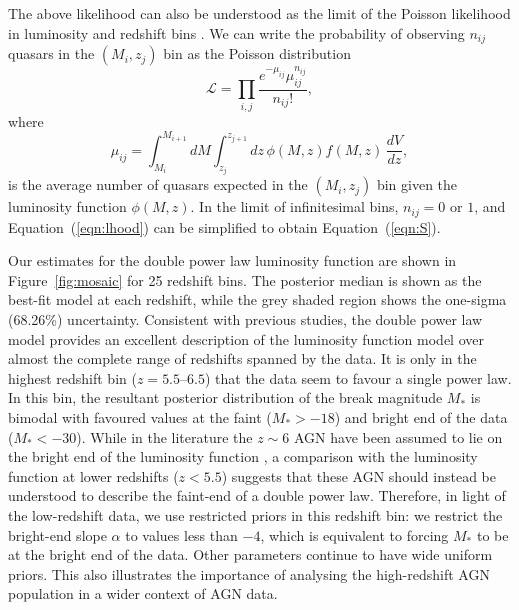 \documentclass[a4paper,fleqn,usenatbib]{mnras}
\begin{document}
The above likelihood can also be understood as the limit of the
Poisson likelihood in luminosity and redshift bins
\citep{1983ApJ...269...35M, 2001AJ....121...54F}.  We can write the
probability of observing $n_{ij}$ quasars in the $(M_i, z_j)$ bin as
the Poisson distribution
\begin{equation}
  \mathcal{L}=\prod_{i,j}\frac{e^{-\mu_{ij}}\mu_{ij}^{n_{ij}}}{n_{ij}!},
  \label{eqn:lhood}
\end{equation}
where 
\begin{equation}
  \mu_{ij}= \int_{M_i}^{M_{i+1}}dM\int_{z_j}^{z_{j+1}}dz\, \phi(M,z) f(M, z)
  \,\frac{dV}{dz},
\end{equation}
is the average number of quasars expected in the $(M_i, z_j)$ bin
given the luminosity function $\phi(M,z)$.  In the limit of
infinitesimal bins, $n_{ij}=0$ or $1$, and Equation~(\ref{eqn:lhood})
can be simplified to obtain Equation~(\ref{eqn:S}).

Our estimates for the double power law luminosity function are shown
in Figure~\ref{fig:mosaic} for 25 redshift bins.  The posterior median
is shown as the best-fit model at each redshift, while the grey shaded
region shows the one-sigma (68.26\%) uncertainty.  Consistent with
previous studies, the double power law model provides an excellent
description of the luminosity function model over almost the complete
range of redshifts spanned by the data.  It is only in the highest
redshift bin ($z=5.5$--$6.5$) that the data seem to favour a single
power law.  In this bin, the resultant posterior distribution of the
break magnitude $M_*$ is bimodal with favoured values at the faint
($M_*>-18$) and bright end of the data ($M_*<-30$).  While in the
literature the $z\sim 6$ AGN have been assumed to lie on the bright
end of the luminosity function \citep[e.g.,][]{2016ApJ...833..222J}, a
comparison with the luminosity function at lower redshifts ($z<5.5$)
suggests that these AGN should instead be understood to describe the
faint-end of a double power law.  Therefore, in light of the
low-redshift data, we use restricted priors in this redshift bin: we
restrict the bright-end slope $\alpha$ to values less than $-4$, which
is equivalent to forcing $M_*$ to be at the bright end of the data.
Other parameters continue to have wide uniform priors.  This also
illustrates the importance of analysing the high-redshift AGN
population in a wider context of AGN data.
\end{document}

